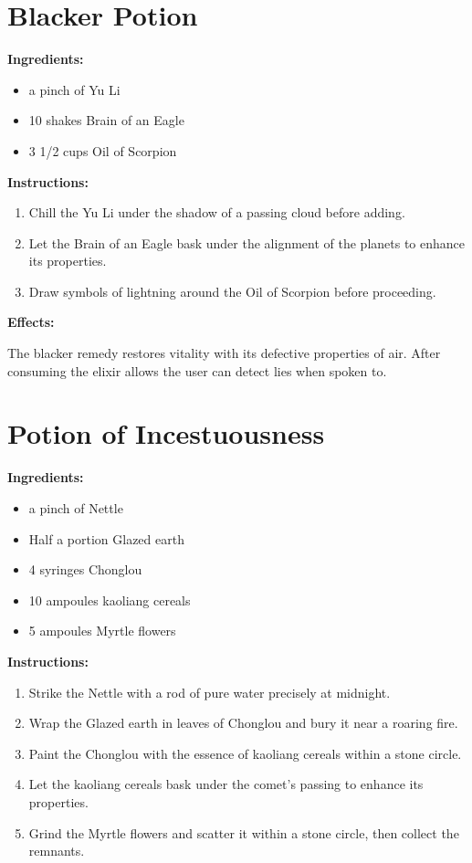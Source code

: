 \documentclass{article}
\begin{document}
\newpage
\section*{Blacker Potion}

\textbf{Ingredients:}

\begin{itemize}
  \item a pinch of Yu Li
  \item 10 shakes Brain of an Eagle
  \item 3 1/2 cups Oil of Scorpion
\end{itemize}

\textbf{Instructions:}

\begin{enumerate}
  \item Chill the Yu Li under the shadow of a passing cloud before adding.
  \item Let the Brain of an Eagle bask under the alignment of the planets to enhance its properties.
  \item Draw symbols of lightning around the Oil of Scorpion before proceeding.
\end{enumerate}

\textbf{Effects:}

The blacker remedy restores vitality with its defective properties of air. After consuming the elixir allows the user can detect lies when spoken to.

\newpage
\section*{Potion of Incestuousness}

\textbf{Ingredients:}

\begin{itemize}
  \item a pinch of Nettle
  \item Half a portion Glazed earth
  \item 4 syringes Chonglou
  \item 10 ampoules kaoliang cereals
  \item 5 ampoules Myrtle flowers
\end{itemize}

\textbf{Instructions:}

\begin{enumerate}
  \item Strike the Nettle with a rod of pure water precisely at midnight.
  \item Wrap the Glazed earth in leaves of Chonglou and bury it near a roaring fire.
  \item Paint the Chonglou with the essence of kaoliang cereals within a stone circle.
  \item Let the kaoliang cereals bask under the comet’s passing to enhance its properties.
  \item Grind the Myrtle flowers and scatter it within a stone circle, then collect the remnants.
\end{enumerate}
\end{document}
